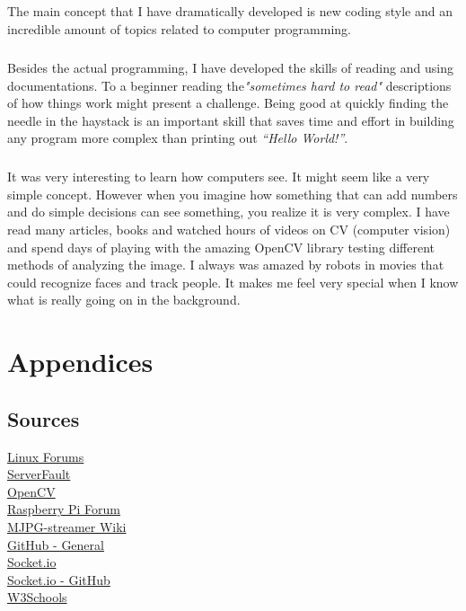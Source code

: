 \documentclass[12pt,a4paper]{report}
\begin{document}
\paragraph{}
The main concept that I have dramatically developed is new coding style and an incredible amount of topics related to computer programming.

\paragraph{}
Besides the actual programming, I have developed the skills of reading and using documentations. To a beginner reading  the\textit{"sometimes hard to read"} descriptions of how things work might present a challenge. Being good at quickly finding the needle in the haystack is an important skill that saves time and effort in building any program more complex than printing out \textit{“Hello World!”}.

\paragraph{}
It was very interesting to learn how computers see. It might seem like a very simple concept. However when you imagine how something that can add numbers and do simple decisions can see something, you realize it is very complex. I have read many articles, books and watched hours of videos on CV (computer vision) and spend days of playing with the amazing OpenCV library testing different methods of analyzing the image. I always was amazed by robots in movies that could recognize faces and track people. It makes me feel very special when I know what is really going on in the background.


\chapter{Appendices}

\section{Sources}

\href{https://www.linuxforums.org/}{Linux Forums}\\
\href{http://serverfault.com/}{ServerFault}\\
\href{http://opencv.org/}{OpenCV}\\
\href{http://www.raspberrypi.org/forum/}{Raspberry Pi Forum}\\
\href{http://sourceforge.net/p/mjpg-streamer/wiki/Home/}{MJPG-streamer Wiki}\\
\href{https://github.com/}{GitHub - General}\\
\href{http://socket.io/}{Socket.io}\\
\href{https://github.com/learnboost/socket.io}{Socket.io - GitHub}\\
\href{http://www.w3schools.com/}{W3Schools}\\
\end{document}
